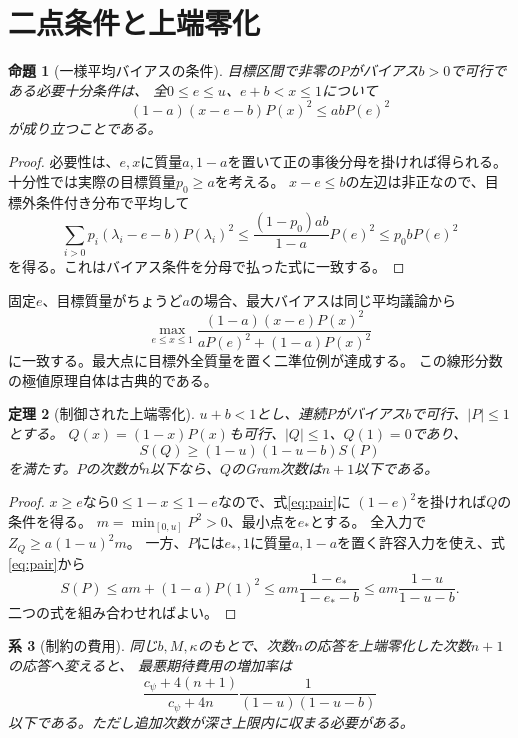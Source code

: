 \documentclass[11pt,a4paper]{article}
\newtheorem{theorem}{定理}
\newtheorem{proposition}[theorem]{命題}
\newtheorem{corollary}[theorem]{系}
\begin{document}
\section{二点条件と上端零化}
\begin{proposition}[一様平均バイアスの条件]\label{prop:pair}
目標区間で非零の$P$がバイアス$b>0$で可行である必要十分条件は、
全$0\leq e\leq u$、$e+b<x\leq1$について
\begin{equation}\label{eq:pair}
 (1-a)(x-e-b)P(x)^2\leq abP(e)^2
\end{equation}
が成り立つことである。
\end{proposition}
\begin{proof}
必要性は、$e,x$に質量$a,1-a$を置いて正の事後分母を掛ければ得られる。
十分性では実際の目標質量$p_0\geq a$を考える。
$x-e\leq b$の左辺は非正なので、目標外条件付き分布で平均して
\[
 \sum_{i>0}p_i(\lambda_i-e-b)P(\lambda_i)^2
 \leq\frac{(1-p_0)ab}{1-a}P(e)^2\leq p_0bP(e)^2
\]
を得る。これはバイアス条件を分母で払った式に一致する。
\end{proof}
固定$e$、目標質量がちょうど$a$の場合、最大バイアスは同じ平均議論から
\begin{equation}\label{eq:two-point}
 \max_{e\leq x\leq1}
 \frac{(1-a)(x-e)P(x)^2}{aP(e)^2+(1-a)P(x)^2}
\end{equation}
に一致する。最大点に目標外全質量を置く二準位例が達成する。
この線形分数の極値原理自体は古典的である\cite{Charnes}。

\begin{theorem}[制御された上端零化]\label{thm:null}
$u+b<1$とし、連続$P$がバイアス$b$で可行、$|P|\leq1$とする。
$Q(x)=(1-x)P(x)$も可行、$|Q|\leq1$、$Q(1)=0$であり、
\begin{equation}\label{eq:null-factor}
 S(Q)\geq(1-u)(1-u-b)S(P)
\end{equation}
を満たす。$P$の次数が$n$以下なら、$Q$のGram次数は$n+1$以下である。
\end{theorem}
\begin{proof}
$x\geq e$なら$0\leq1-x\leq1-e$なので、式\eqref{eq:pair}に
$(1-e)^2$を掛ければ$Q$の条件を得る。
$m=\min_{[0,u]}P^2>0$、最小点を$e_*$とする。
全入力で$Z_Q\geq a(1-u)^2m$。
一方、$P$には$e_*,1$に質量$a,1-a$を置く許容入力を使え、式\eqref{eq:pair}から
\[
 S(P)\leq am+(1-a)P(1)^2
 \leq am\frac{1-e_*}{1-e_*-b}
 \leq am\frac{1-u}{1-u-b}.
\]
二つの式を組み合わせればよい。
\end{proof}

\begin{corollary}[制約の費用]\label{cor:restriction}
同じ$b,M,\kappa$のもとで、次数$n$の応答を上端零化した次数$n+1$の応答へ変えると、
最悪期待費用の増加率は
\begin{equation}\label{eq:restriction-cost}
 \frac{c_\psi+4(n+1)}{c_\psi+4n}\frac1{(1-u)(1-u-b)}
\end{equation}
以下である。ただし追加次数が深さ上限内に収まる必要がある。
\end{corollary}
\end{document}
